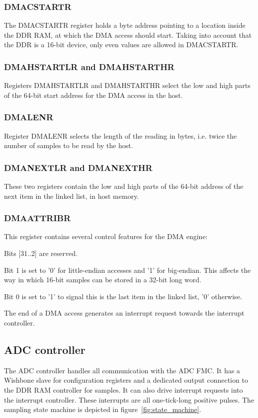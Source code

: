 \documentclass{article}
\newenvironment{packed_item}{
\begin{itemize}
  \setlength{\itemsep}{1pt}
  \setlength{\parskip}{0pt}
  \setlength{\parsep}{0pt}
}{\end{itemize}}
\begin{document}
\subsubsection{DMACSTARTR}
The DMACSTARTR register holds a byte address pointing to a location inside the DDR RAM, at which the DMA access should start. Taking into account that the DDR is a 16-bit device, only even values are allowed in DMACSTARTR.

\subsubsection{DMAHSTARTLR and DMAHSTARTHR}
Registers DMAHSTARTLR and DMAHSTARTHR select the low and high parts of the 64-bit start address for the DMA access in the host. 

\subsubsection{DMALENR}
Register DMALENR selects the length of the reading in bytes, i.e. twice the number of samples to be read by the host.

\subsubsection{DMANEXTLR and DMANEXTHR}
These two registers contain the low and high parts of the 64-bit address of the next item in the linked list, in host memory.

\subsubsection{DMAATTRIBR}
This register contains several control features for the DMA engine:
\begin{packed_item}
\item Bits [31..2] are reserved.
\item Bit 1 is set to '0' for little-endian accesses and '1' for big-endian. This affects the way in which 16-bit samples can be stored in a 32-bit long word.
\item Bit 0 is set to '1' to signal this is the last item in the linked list, '0' otherwise.
\end{packed_item}

The end of a DMA access generates an interrupt request towards the interrupt controller.

\subsection{ADC controller}
The ADC controller handles all communication with the ADC FMC. It has a Wishbone slave for configuration registers and a dedicated output connection to the DDR RAM controller for samples. It can also drive interrupt requests into the interrupt controller. These interrupts are all one-tick-long positive pulses. The sampling state machine is depicted in figure~\ref{fig:state_machine}. 
\end{document}
